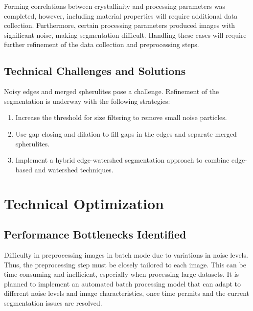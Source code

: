 \documentclass[12pt]{article}
\begin{document}
Forming correlations between crystallinity and processing parameters was completed, however, including material properties will require
 additional data collection. Furthermore, certain processing parameters produced images with significant noise, making segmentation 
 difficult. Handling these cases will require further refinement of the data collection and preprocessing steps.

\subsection{Technical Challenges and Solutions}
Noisy edges and merged spherulites pose a challenge. Refinement of the segmentation is underway with the following strategies:
\begin{enumerate}[noitemsep]
    \item Increase the threshold for size filtering to remove small noise particles.
    \item Use gap closing and dilation to fill gaps in the edges and separate merged spherulites.
    \item Implement a hybrid edge-watershed segmentation approach to combine edge-based and watershed techniques.
\end{enumerate}



\section{Technical Optimization}

\subsection{Performance Bottlenecks Identified}
Difficulty in preprocessing images in batch mode due to variations in noise levels. Thus, the preprocessing step must be 
closely tailored to each image. This can be time-consuming and inefficient, especially when processing large datasets. It is planned to implement 
an automated batch processing model that can adapt to different noise levels and image characteristics, once time permits and the current
segmentation issues are resolved.
\end{document}
